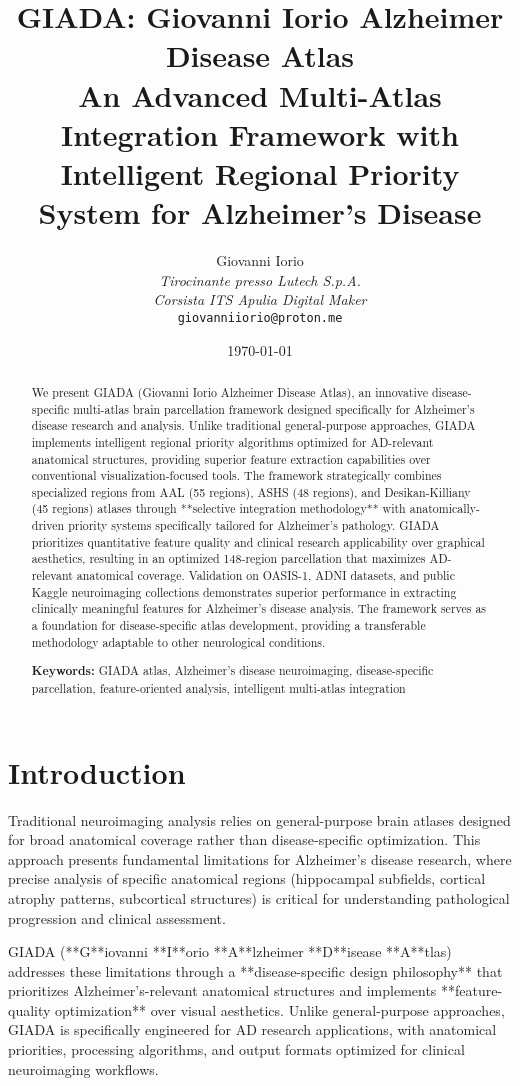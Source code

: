 \documentclass[a4paper,11pt]{article}
\title{GIADA: Giovanni Iorio Alzheimer Disease Atlas \\ An Advanced Multi-Atlas Integration Framework with Intelligent Regional Priority System for Alzheimer's Disease}
\author{
    Giovanni Iorio\\
    \textit{Tirocinante presso Lutech S.p.A.}\\
    \textit{Corsista ITS Apulia Digital Maker}\\
    \texttt{giovanniiorio@proton.me}
}
\date{\today}
\begin{document}
\maketitle

\begin{abstract}
We present GIADA (Giovanni Iorio Alzheimer Disease Atlas), an innovative disease-specific multi-atlas brain parcellation framework designed specifically for Alzheimer's disease research and analysis. Unlike traditional general-purpose approaches, GIADA implements intelligent regional priority algorithms optimized for AD-relevant anatomical structures, providing superior feature extraction capabilities over conventional visualization-focused tools. The framework strategically combines specialized regions from AAL (55 regions), ASHS (48 regions), and Desikan-Killiany (45 regions) atlases through **selective integration methodology** with anatomically-driven priority systems specifically tailored for Alzheimer's pathology. GIADA prioritizes quantitative feature quality and clinical research applicability over graphical aesthetics, resulting in an optimized 148-region parcellation that maximizes AD-relevant anatomical coverage. Validation on OASIS-1, ADNI datasets, and public Kaggle neuroimaging collections demonstrates superior performance in extracting clinically meaningful features for Alzheimer's disease analysis. The framework serves as a foundation for disease-specific atlas development, providing a transferable methodology adaptable to other neurological conditions.

\textbf{Keywords:} GIADA atlas, Alzheimer's disease neuroimaging, disease-specific parcellation, feature-oriented analysis, intelligent multi-atlas integration
\end{abstract}

\section{Introduction}

Traditional neuroimaging analysis relies on general-purpose brain atlases designed for broad anatomical coverage rather than disease-specific optimization. This approach presents fundamental limitations for Alzheimer's disease research, where precise analysis of specific anatomical regions (hippocampal subfields, cortical atrophy patterns, subcortical structures) is critical for understanding pathological progression and clinical assessment.

GIADA (**G**iovanni **I**orio **A**lzheimer **D**isease **A**tlas) addresses these limitations through a **disease-specific design philosophy** that prioritizes Alzheimer's-relevant anatomical structures and implements **feature-quality optimization** over visual aesthetics. Unlike general-purpose approaches, GIADA is specifically engineered for AD research applications, with anatomical priorities, processing algorithms, and output formats optimized for clinical neuroimaging workflows.
\end{document}

